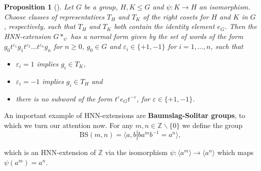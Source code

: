 \documentclass[letterpaper,10pt]{article}
\theoremstyle{plain}
\newtheorem{proposition}[theorem]{Proposition}
\begin{document}
\begin{proposition}[{\cite[Chapter~1]{lyndon_schupp_1977}}] \label{prop.hnn_general_normal_form}Let $G$ be a group, $H,K\le G$ and $\psi:K\to H$ an isomorphism. 
	Choose classes of representatives $T_H$ and $T_K$ of the right cosets for $H$ and $K$ in $G$, respectively, such that $T_H$ and $T_K$ both contain the identity element $e_G$. Then the HNN-extension $G*_\psi$ has a normal form given by the set of words of the form $g_0t^{\varepsilon_1}g_1t^{\varepsilon_2}\ldots t^{\varepsilon_n}g_n$ for $n\ge 0$, $g_0\in G$ and $\varepsilon_i\in \{+1,-1\}$ for $i=1,\ldots,n$, such that
	\begin{itemize}
		\item $\varepsilon_i=1 $ implies $g_i\in T_K$,
		\item $\varepsilon_i=-1$ implies $g_i\in T_H$ and 
		\item there is no subword of the form $t^\varepsilon e_G t^{-\varepsilon}$, for $\varepsilon\in\{+1,-1\}$.
	\end{itemize} 
\end{proposition}
%

An important example of HNN-extensions are \textbf{Baumslag-Solitar groups}, to which we turn our attention now. For any $m,n\in \mathbb{Z}\backslash\{0\}$ we define the group 
$$\mathrm{BS}(m,n)=\langle a,b \left|\right. ba^mb^{-1}=a^n\rangle,$$ 

which is an HNN-extension of $\mathbb{Z}$ via the isomorphism $\psi:\langle a^m \rangle\to \langle a^n\rangle$ which maps $\psi(a^m)=a^n$.
\end{document}
